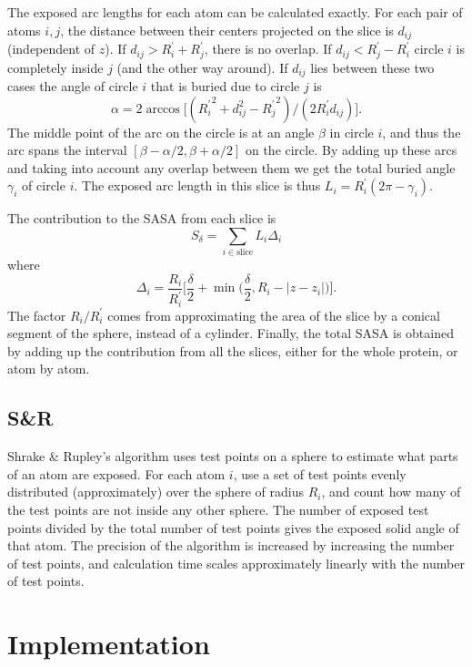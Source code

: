 \documentclass[a4paper,11pt]{article}
\begin{document}
\begin{small}
The exposed arc lengths for each atom can be calculated exactly. For
each pair of atoms $i,j$, the distance between their centers projected
on the slice is $d_{ij}$ (independent of $z$). If $d_{ij} > R_i^\prime
+ R_j^\prime$, there is no overlap. If $d_{ij} < R_j^\prime -
R_i^\prime$ circle $i$ is completely inside $j$ (and the other way
around). If $d_{ij}$ lies between these two cases the angle of circle
$i$ that is buried due to circle $j$ is $$\alpha = 2\arccos
\bigl[({R_i^\prime}^2 + d_{ij}^2 - {R_{j}^\prime}^2)/(2R_i^\prime
  d_{ij})\bigr].$$ The middle point of the arc on the circle is at an
angle $\beta$ in circle $i$, and thus the arc spans the interval
$[\beta-\alpha/2,\beta+\alpha/2]$ on the circle. By adding up these
arcs and taking into account any overlap between them we get the total
buried angle $\gamma_i$ of circle $i$. The exposed arc length in this
slice is thus $L_i = R_i^\prime(2\pi-\gamma_i)$.

The contribution to the SASA from each slice is $$ S_\delta =
\sum_{i \in \text{slice}}L_i\Delta_i $$ where
$$
  \Delta_i = \frac{R_i}{R_i^\prime} \biggl[\frac{\delta}{2} 
    + \min\biggl(\frac{\delta}{2},R_i -
    \lvert z - z_i \rvert\biggr)\biggr]. 
$$ 
The factor $R_i/R_i^\prime$ comes from approximating the area of the
slice by a conical segment of the sphere, instead of a cylinder.
Finally, the total SASA is obtained by adding up the contribution from
all the slices, either for the whole protein, or atom by atom.

\subsection{S\&R}

Shrake \& Rupley's algorithm uses test points on a sphere to estimate
what parts of an atom are exposed. For each atom $i$, use a set of
test points evenly distributed (approximately) over the sphere of
radius $R_i$, and count how many of the test points are not inside any
other sphere. The number of exposed test points divided by the total
number of test points gives the exposed solid angle of that atom. The
precision of the algorithm is increased by increasing the number of
test points, and calculation time scales approximately linearly with
the number of test points.

\section{Implementation}\label{sec:imp}


\end{small}
\end{document}
